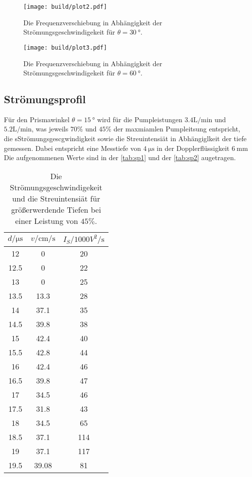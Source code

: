 \begin{figure}[H]
	\texttt{[image: build/plot2.pdf]}
	\caption{Die Frequenzverschiebung in Abhängigkeit der Strömungsgeschwindigekeit für $\theta = \qty{30}{°}$.}
	\label{fig:plot2}
\end{figure}

\begin{figure}[H]
	\texttt{[image: build/plot3.pdf]}
	\caption{Die Frequenzverschiebung in Abhängigkeit der Strömungsgeschwindigekeit für $\theta = \qty{60}{°}$.}
	\label{fig:plot3}
\end{figure}

\subsection{Strömungsprofil}
\label{sec:Strömungsprofil}

Für den Prismawinkel $\theta = \qty{15}{°}$ wird für die Pumpleistungen $ 3.4 \si{\liter\per\minute}$ und $ 5.2 \si{\liter\per\minute}$, was jeweils
$70\%$  und $45\%$ der maxmiamlen Pumpleitsung entspricht, die sStrömungsgescgwindigkeit sowie die Streuintensiät in Abhängiglkeit der tiefe gemessen.
Dabei entspricht eine Messtiefe von $\qty{4}{\micro\second}$ in der Dopplerflüssigkeit $\qty{6}{\milli\meter}$
Die aufgenommenen Werte sind in der \autoref{tab:sp1} und der \autoref{tab:sp2} augetragen.

\begin{table}[H]
    \centering
    \caption{Die Strömungsgeschwindigekeit und die Streuintensiät für größerwerdende Tiefen bei einer Leistung von $45 \%$.}
    \label{tab:sp1}
\begin{tabular}{c c c}
    \toprule
    $d / \si{\micro\second}$ & $ v / \si{\centi \meter \per \second}$ & $I_S / 1000 \si{ V^2 \per \second} $\\
    \midrule
      12 &     0 &  20 \\
    12.5 &     0 &  22 \\
      13 &     0 &  25 \\
    13.5 &  13.3 &  28 \\
      14 &  37.1 &  35 \\
    14.5 &  39.8 &  38 \\
      15 &  42.4 &  40 \\
    15.5 &  42.8 &  44 \\
      16 &  42.4 &  46 \\
    16.5 &  39.8 &  47 \\
      17 &  34.5 &  46 \\
    17.5 &  31.8 &  43 \\
      18 &  34.5 &  65 \\
    18.5 &  37.1 & 114 \\
      19 &  37.1 & 117 \\
    19.5 & 39.08 &  81 \\
    \bottomrule
    \end{tabular}
\end{table}

